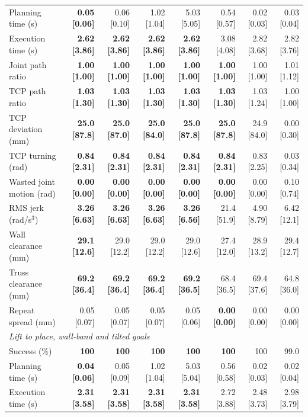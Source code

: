 \begin{table}[t]
\begin{tabular}{lrrrrrrr}
Planning time (s) & \textbf{0.05 [0.06]} & 0.06 [0.10] & 1.02 [1.04] & 5.03 [5.05] & 0.54 [0.57] & 0.02 [0.03] & 0.03 [0.04] \\
Execution time (s) & \textbf{2.62 [3.86]} & \textbf{2.62 [3.86]} & \textbf{2.62 [3.86]} & \textbf{2.62 [3.86]} & 3.08 [4.08] & 2.82 [3.68] & 2.82 [3.76] \\
Joint path ratio & \textbf{1.00 [1.00]} & \textbf{1.00 [1.00]} & \textbf{1.00 [1.00]} & \textbf{1.00 [1.00]} & \textbf{1.00 [1.00]} & 1.00 [1.00] & 1.01 [1.12] \\
TCP path ratio & \textbf{1.03 [1.30]} & \textbf{1.03 [1.30]} & \textbf{1.03 [1.30]} & \textbf{1.03 [1.30]} & \textbf{1.03 [1.30]} & 1.03 [1.24] & 1.00 [1.00] \\
TCP deviation (mm) & \textbf{25.0 [87.8]} & \textbf{25.0 [87.0]} & \textbf{25.0 [84.0]} & \textbf{25.0 [87.8]} & \textbf{25.0 [87.8]} & 24.9 [84.0] & 0.00 [0.30] \\
TCP turning (rad) & \textbf{0.84 [2.31]} & \textbf{0.84 [2.31]} & \textbf{0.84 [2.31]} & \textbf{0.84 [2.31]} & \textbf{0.84 [2.31]} & 0.83 [2.25] & 0.03 [0.34] \\
Wasted joint motion (rad) & \textbf{0.00 [0.00]} & \textbf{0.00 [0.00]} & \textbf{0.00 [0.00]} & \textbf{0.00 [0.00]} & \textbf{0.00 [0.00]} & 0.00 [0.00] & 0.10 [0.74] \\
RMS jerk (rad/s$^3$) & \textbf{3.26 [6.63]} & \textbf{3.26 [6.63]} & \textbf{3.26 [6.63]} & \textbf{3.26 [6.56]} & 21.4 [51.9] & 4.90 [8.79] & 6.42 [12.1] \\
Wall clearance (mm) & \textbf{29.1 [12.6]} & 29.0 [12.2] & 29.0 [12.2] & 29.0 [12.6] & 27.4 [12.0] & 28.9 [13.2] & 29.4 [12.7] \\
Truss clearance (mm) & \textbf{69.2 [36.4]} & \textbf{69.2 [36.4]} & \textbf{69.2 [36.4]} & \textbf{69.2 [36.5]} & 68.4 [36.5] & 69.4 [37.6] & 64.8 [36.0] \\
Repeat spread (mm) & 0.05 [0.07] & 0.05 [0.07] & 0.05 [0.07] & 0.05 [0.06] & \textbf{0.00 [0.00]} & 0.00 [0.00] & 0.00 [0.00] \\
\midrule
\multicolumn{8}{l}{\emph{Lift to place, wall-band and tilted goals}} \\
Success (\%) & \textbf{100} & \textbf{100} & \textbf{100} & \textbf{100} & \textbf{100} & 100 & 99.0 \\
Planning time (s) & \textbf{0.04 [0.06]} & 0.05 [0.09] & 1.02 [1.04] & 5.03 [5.04] & 0.56 [0.58] & 0.02 [0.03] & 0.02 [0.04] \\
Execution time (s) & \textbf{2.31 [3.58]} & \textbf{2.31 [3.58]} & \textbf{2.31 [3.58]} & \textbf{2.31 [3.58]} & 2.72 [3.88] & 2.48 [3.73] & 2.98 [3.79] \\

\end{tabular}
\end{table}
